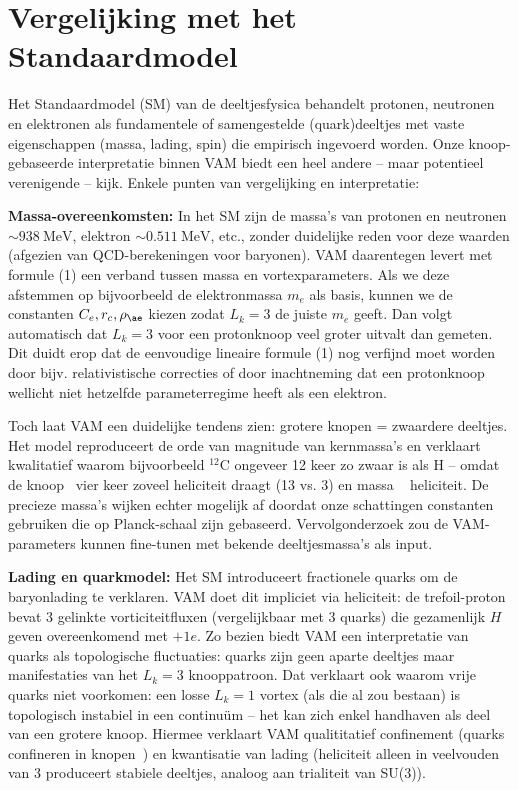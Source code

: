 \section{Vergelijking met het Standaardmodel}

Het Standaardmodel (SM) van de deeltjesfysica behandelt protonen, neutronen en elektronen als fundamentele of samengestelde (quark)deeltjes met vaste eigenschappen (massa, lading, spin) die empirisch ingevoerd worden. Onze knoop-gebaseerde interpretatie binnen VAM biedt een heel andere – maar potentieel verenigende – kijk. Enkele punten van vergelijking en interpretatie:

\textbf{Massa-overeenkomsten:} In het SM zijn de massa’s van protonen en neutronen $\sim938~\text{MeV}$, elektron $\sim0.511~\text{MeV}$, etc., zonder duidelijke reden voor deze waarden (afgezien van QCD-berekeningen voor baryonen). VAM daarentegen levert met formule (1) een verband tussen massa en vortexparameters. Als we deze afstemmen op bijvoorbeeld de elektronmassa $m_e$ als basis, kunnen we de constanten $C_e, r_c, \rho_{\ae}$ kiezen zodat $L_k=3$ de juiste $m_e$ geeft. Dan volgt automatisch dat $L_k=3$ voor een protonknoop veel groter uitvalt dan gemeten. Dit duidt erop dat de eenvoudige lineaire formule (1) nog verfijnd moet worden door bijv. relativistische correcties of door inachtneming dat een protonknoop wellicht niet hetzelfde parameterregime heeft als een elektron.

Toch laat VAM een duidelijke tendens zien: grotere knopen = zwaardere deeltjes. Het model reproduceert de orde van magnitude van kernmassa’s en verklaart kwalitatief waarom bijvoorbeeld $^{12}$C ongeveer 12 keer zo zwaar is als H – omdat de knoop ~vier keer zoveel heliciteit draagt (13 vs. 3) en massa ~ heliciteit. De precieze massa’s wijken echter mogelijk af doordat onze schattingen constanten gebruiken die op Planck-schaal zijn gebaseerd. Vervolgonderzoek zou de VAM-parameters kunnen fine-tunen met bekende deeltjesmassa’s als input.

\textbf{Lading en quarkmodel:} Het SM introduceert fractionele quarks om de baryonlading te verklaren. VAM doet dit impliciet via heliciteit: de
trefoil-proton bevat 3 gelinkte vorticiteitfluxen (vergelijkbaar met 3 quarks) die gezamenlijk $H$ geven overeenkomend met $+1e$. Zo bezien biedt VAM een interpretatie van quarks als topologische fluctuaties: quarks zijn geen aparte deeltjes maar manifestaties van het $L_k=3$ knooppatroon. Dat verklaart ook waarom vrije quarks niet voorkomen: een losse $L_k=1$ vortex (als die al zou bestaan) is topologisch instabiel in een continuüm – het kan zich enkel handhaven als deel van een grotere knoop. Hiermee verklaart VAM qualititatief confinement (quarks confineren in knopen~\cite{Faddeev1997KnottedSolitions}) en kwantisatie van lading (heliciteit alleen in veelvouden van 3 produceert stabiele deeltjes, analoog aan trialiteit van SU(3)).

